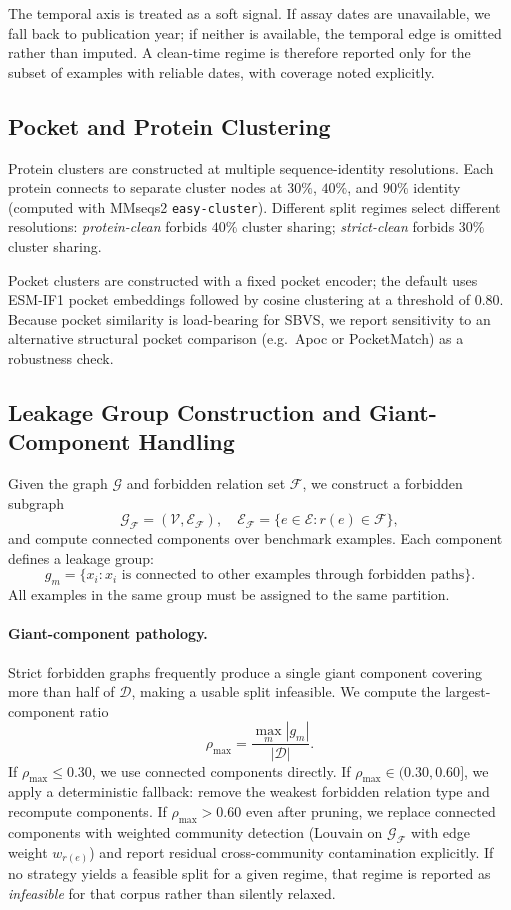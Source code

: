 \documentclass[11pt]{article}
\begin{document}
The temporal axis is treated as a soft signal. If assay dates are unavailable, we fall back to publication year; if neither is available, the temporal edge is omitted rather than imputed. A clean-time regime is therefore reported only for the subset of examples with reliable dates, with coverage noted explicitly.

\subsection{Pocket and Protein Clustering}

Protein clusters are constructed at multiple sequence-identity resolutions. Each protein connects to separate cluster nodes at \(30\%\), \(40\%\), and \(90\%\) identity (computed with MMseqs2 \texttt{easy-cluster}). Different split regimes select different resolutions: \emph{protein-clean} forbids \(40\%\) cluster sharing; \emph{strict-clean} forbids \(30\%\) cluster sharing.

Pocket clusters are constructed with a fixed pocket encoder; the default uses ESM-IF1 pocket embeddings followed by cosine clustering at a threshold of \(0.80\). Because pocket similarity is load-bearing for SBVS, we report sensitivity to an alternative structural pocket comparison (e.g.\ Apoc or PocketMatch) as a robustness check.

\subsection{Leakage Group Construction and Giant-Component Handling}

Given the graph \(\mathcal{G}\) and forbidden relation set \(\mathcal{F}\), we construct a forbidden subgraph
\[
\mathcal{G}_{\mathcal{F}} = (\mathcal{V}, \mathcal{E}_{\mathcal{F}}),
\quad
\mathcal{E}_{\mathcal{F}} = \{ e \in \mathcal{E} : r(e) \in \mathcal{F} \},
\]
and compute connected components over benchmark examples. Each component defines a leakage group:
\[
g_m = \{ x_i : x_i \text{ is connected to other examples through forbidden paths} \}.
\]
All examples in the same group must be assigned to the same partition.

\paragraph{Giant-component pathology.}
Strict forbidden graphs frequently produce a single giant component covering more than half of \(\mathcal{D}\), making a usable split infeasible. We compute the largest-component ratio
\[
\rho_{\max} = \frac{\max_m |g_m|}{|\mathcal{D}|}.
\]
If \(\rho_{\max} \leq 0.30\), we use connected components directly. If \(\rho_{\max} \in (0.30, 0.60]\), we apply a deterministic fallback: remove the weakest forbidden relation type and recompute components. If \(\rho_{\max} > 0.60\) even after pruning, we replace connected components with weighted community detection (Louvain on \(\mathcal{G}_{\mathcal{F}}\) with edge weight \(w_{r(e)}\)) and report residual cross-community contamination explicitly. If no strategy yields a feasible split for a given regime, that regime is reported as \emph{infeasible} for that corpus rather than silently relaxed.
\end{document}
